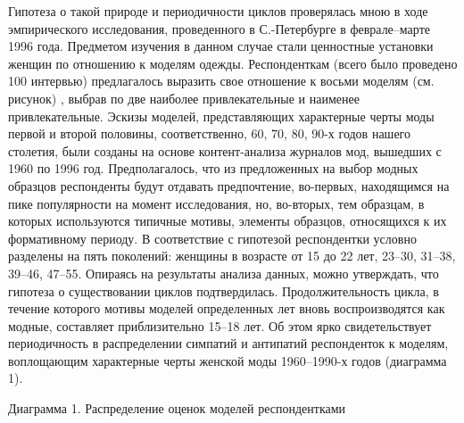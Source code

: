   Гипотеза о такой природе и периодичности циклов проверялась мною в ходе
  эмпирического исследования, проведенного в С.-Петербурге в феврале--марте
  1996 года. Предметом изучения в данном случае стали ценностные установки
  женщин по отношению к моделям одежды. Респонденткам (всего было проведено
  100 интервью) предлагалось выразить свое отношение к восьми моделям
  (см. рисунок) , выбрав по две наиболее привлекательные и наименее
  привлекательные. Эскизы моделей, представляющих характерные черты моды первой
  и второй половины, соответственно, 60, 70, 80, 90-х годов нашего столетия,
  были созданы на основе контент-анализа журналов мод, вышедших с 1960 по
  1996 год. Предполагалось, что из предложенных на выбор модных образцов респонденты будут отдавать предпочтение, во-первых, находящимся на пике популярности на момент исследования, но, во-вторых, тем образцам, в которых используются типичные мотивы, элементы образцов, относящихся к их формативному периоду. В соответствие с гипотезой респондентки условно разделены на пять поколений: женщины в возрасте от 15 до 22 лет, 23–30, 31–38, 39–46, 47–55.
Опираясь на результаты анализа данных, можно утверждать, что гипотеза о существовании циклов подтвердилась. Продолжительность цикла, в течение которого мотивы моделей определенных лет вновь воспроизводятся как модные, составляет приблизительно 15–18 лет. Об этом ярко свидетельствует периодичность в распределении симпатий и антипатий респонденток к моделям, воплощающим характерные черты женской моды 1960–1990-х годов (диаграмма 1).




Диаграмма 1. Распределение оценок моделей респондентками
 
